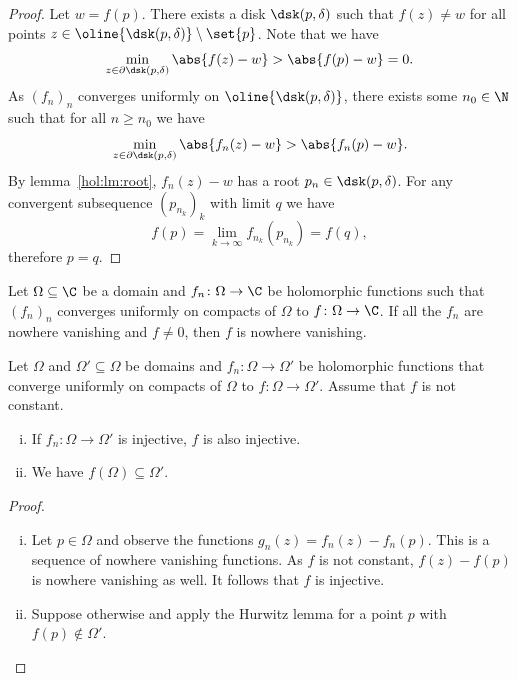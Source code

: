 \begin{proof}
Let $w = f(p)$. There exists a disk $\dsk(p, \delta)$ such that
$f(z) \ne w$ for all points
$z \in \oline{\dsk(p, \delta)} \setminus \set{p}$. Note that we
have
\[
\min_{z \in \partial \dsk(p, \delta)} \abs{f(z) - w} >
\abs{f(p) - w} =
0.
\]
As $(f_n)_n$ converges uniformly on $\oline{\dsk(p, \delta)}$,
there exists some $n_0 \in \N$ such that for all $n \geq n_0$ we
have
\[
\min_{z \in \partial \dsk(p, \delta)} \abs{f_n(z) - w} >
\abs{f_n(p) - w}.
\]
By lemma~\ref{hol:lm:root}, $f_n(z) - w$ has a root
$p_n \in \dsk(p, \delta)$. For any convergent subsequence
$(p_{n_k})_k$ with limit $q$ we have
\[
f(p) = \lim_{k \to \infty} f_{n_k}(p_{n_k}) = f(q),
\]
therefore $p = q$.
\end{proof}

\begin{posledica}\label{thm_hol:cor:hurw}
Let $\Omega \subseteq \C$ be a domain and
$f_n \colon \Omega \to \C$ be holomorphic functions such that
$(f_n)_n$ converges uniformly on compacts of $\Omega$ to
$f \colon \Omega \to \C$. If all the $f_n$ are nowhere vanishing
and $f \ne 0$, then $f$ is nowhere vanishing.
\end{posledica}

\obvs

\begin{izrek}[Hurwitz]
Let $\Omega$ and $\Omega' \subseteq \Omega$ be domains and
$f_n \colon \Omega \to \Omega'$ be holomorphic functions that
converge uniformly on compacts of $\Omega$ to
$f \colon \Omega \to \Omega'$. Assume that $f$ is not constant.

\begin{enumerate}[i)]
\item If $f_n \colon \Omega \to \Omega'$ is injective, $f$ is also
injective.
\item We have $f(\Omega) \subseteq \Omega'$.
\end{enumerate}
\end{izrek}

\begin{proof}
\phantom{a}
\begin{enumerate}[i)]
\item Let $p \in \Omega$ and observe the functions
$g_n(z) = f_n(z) - f_n(p)$. This is a sequence of nowhere vanishing
functions. As $f$ is not constant, $f(z) - f(p)$ is nowhere
vanishing as well. It follows that $f$ is injective.
\item Suppose otherwise and apply the Hurwitz lemma for a point
$p$ with $f(p) \not \in \Omega'$. \qedhere
\end{enumerate}
\end{proof}

